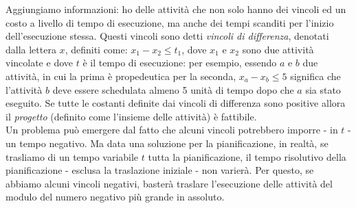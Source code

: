 Aggiungiamo informazioni: ho delle attività che non solo hanno dei vincoli ed un costo a livello di tempo di esecuzione, ma anche dei tempi scanditi per l'inizio dell'esecuzione stessa. Questi vincoli sono detti \textit{vincoli di differenza}, denotati dalla lettera $x$, definiti come: $x_1 - x_2 \leq t_1$, dove $x_1$ e $x_2$ sono due attività vincolate e dove $t$ è il tempo di esecuzione: per esempio, essendo $a$ e $b$ due attività, in cui la prima è propedeutica per la seconda, $x_a - x_b \leq 5$ significa che l'attività $b$ deve essere schedulata almeno 5 unità di tempo dopo che $a$ sia stato eseguito. Se tutte le costanti definite dai vincoli di differenza sono positive allora il \textit{progetto} (definito come l'insieme delle attività) è fattibile. \\

Un problema può emergere dal fatto che alcuni vincoli potrebbero imporre - in $t$ - un tempo negativo. Ma data una soluzione per la pianificazione, in realtà, se trasliamo di un tempo variabile $t$ tutta la pianificazione, il tempo risolutivo della pianificazione - esclusa la traslazione iniziale - non varierà. Per questo, se abbiamo alcuni vincoli negativi, basterà traslare l'esecuzione delle attività del modulo del numero negativo più grande in assoluto.

